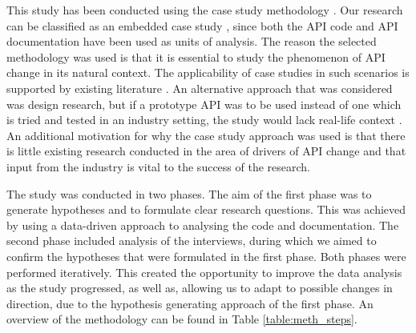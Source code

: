 \documentclass{sig-alternate}
\begin{document}
This study has been conducted using the case study methodology \cite{runeson2009guidelines}. Our research can be classified as an embedded case study \cite{yin2013case}, since both the API code and API documentation have been used as units of analysis. The reason the selected methodology was used is that it is essential to study the phenomenon of API change in its natural context. The applicability of case studies in such scenarios is supported by existing literature \cite{benbasat1987case, robson2002real, runeson2009guidelines, yin2013case}. An alternative approach that was considered was design research, but if a prototype API was to be used instead of one which is tried and tested in an industry setting, the study would lack real-life context \cite{runeson2009guidelines}. An additional motivation for why the case study approach was used is that there is little existing research conducted in the area of drivers of API change and that input from the industry is vital to the success of the research. 

The study was conducted in two phases. The aim of the first phase was to generate hypotheses and to formulate clear research questions. This was achieved by using a data-driven approach to analysing the code and documentation. The second phase included analysis of the interviews, during which we aimed to confirm the hypotheses that were formulated in the first phase. Both phases were performed iteratively. This created the opportunity to improve the data analysis as the study progressed, as well as, allowing us to adapt to possible changes in direction, due to the hypothesis generating approach of the first phase. An overview of the methodology can be found in Table \ref{table:meth_steps}.
\end{document}
